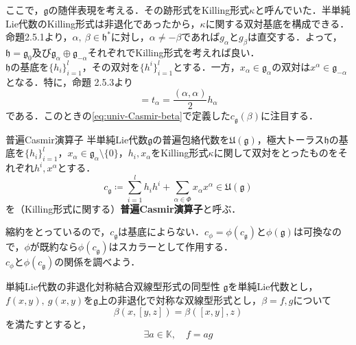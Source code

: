 \documentclass[rep_main]{subfiles}
\begin{document}
ここで，$\mathfrak{g}$の随伴表現を考える．その跡形式をKilling形式$\kappa$と呼んでいた．半単純Lie代数のKilling形式は非退化であったから，$\kappa$に関する双対基底を構成できる．\\
命題2.5.1より，$\alpha,\ \beta \in \mathfrak{h}^*$に対し，$\alpha \neq -\beta$であれば$g_\alpha$と$g_\beta$は直交する．よって，$\mathfrak{h} = \mathfrak{g}_0$及び$\mathfrak{g}_\alpha \oplus \mathfrak{g}_{-\alpha}$それぞれでKilling形式を考えれば良い．\\
$\mathfrak{h}$の基底を$\{h_i\}_{i=1}^l$，その双対を$\{h^i\}_{i=1}^l$とする．一方，$x_\alpha \in \mathfrak{g}_\alpha$の双対は$x^\alpha \in \mathfrak{g}_{-\alpha}$となる．特に，命題 2.5.3より
\begin{equation}
	[x_\alpha, x^\alpha] = t_\alpha = \frac{(\alpha, \alpha)}{2}h_\alpha
\end{equation}
である．このときの\eqref{eq:univ-Casmir-beta}で定義した$c_\mathfrak{g}(\beta)$に注目する．
\begin{mydef}[label=def:univ-Casmir-op]{普遍Casmir演算子}
	半単純Lie代数$\mathfrak{g}$の普遍包絡代数を$\mathfrak{U}(\mathfrak{g})$，極大トーラス$\mathfrak{h}$の基底を$\{h_i\}_{i=1}^l$，$x_\alpha \in \mathfrak{g}_\alpha \setminus \{0\}$，$h_i, x_\alpha$をKilling形式$\kappa$に関して双対をとったものをそれぞれ$h^i, x^\alpha$とする．
	\begin{equation}
		c_\mathfrak{g} \coloneqq \sum_{i=1}^l h_ih^i + \sum_{\alpha \in \Phi} x_\alpha x^\alpha \in \mathfrak{U}(\mathfrak{g})
	\end{equation}
	を（Killing形式に関する）\textbf{普遍Casmir演算子}と呼ぶ．
\end{mydef}
縮約をとっているので，$c_\mathfrak{g}$は基底によらない．$c_\phi = \phi(c_\mathfrak{g})$と$\phi(\mathfrak{g})$は可換なので，$\phi$が既約なら$\phi(c_\mathfrak{g})$はスカラーとして作用する．\\
$c_\phi$と$\phi(c_\mathfrak{g})$の関係を調べよう．
\begin{mylem}[label=lem:]{単純Lie代数の非退化対称結合双線型形式の同型性}
	$\mathfrak{g}$を単純Lie代数とし，$f(x, y),\ g(x, y)$を$\mathfrak{g}$上の非退化で対称な双線型形式とし，$\beta = f, g$について
	\begin{equation}
		\label{eq:associative-bilinear}
		\beta(x, [y, z]) = \beta([x, y], z)
	\end{equation}
	を満たすとすると，
	\begin{equation}
		\exists a \in \mathbb{K},\quad  f = ag
	\end{equation}
\end{mylem}
\end{document}
